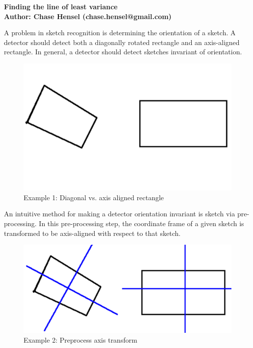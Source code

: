 \documentclass{article}
\begin{document}
{ \Large \bf 
Finding the line of least variance\\
Author: Chase Hensel (chase.hensel@gmail.com)
}

A problem in sketch recognition is determining the orientation of a sketch. A detector should detect both a diagonally rotated rectangle and an axis-aligned rectangle. In general, a detector should detect sketches invariant of orientation. 
\begin{figure}[htbp]
\begin{center}
\includegraphics[scale=.5, clip=true, trim=0 100 0 50]{example1}
\caption{Example 1: Diagonal vs. axis aligned rectangle}
\label{ex1}
\end{center}
\end{figure}

An intuitive method for making a detector orientation invariant is sketch via pre-processing. In this pre-processing step, the coordinate frame of a given sketch is transformed to be axis-aligned with respect to that sketch.

\begin{figure}[htbp]
\begin{center}
\includegraphics[scale=.5]{example2}
\caption{Example 2: Preprocess axis transform}
\label{ex2}
\end{center}
\end{figure}
\end{document}
